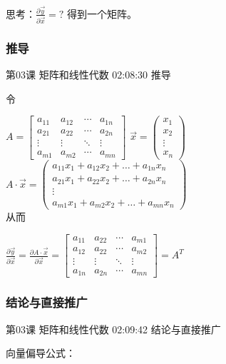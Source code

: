 \documentclass[UTF8]{ctexart}
\begin{document}
思考：$\frac{\partial \vec{y}}{\partial \vec{x}}=?$ 得到一个矩阵。

\subsubsection{推导}

第03课 矩阵和线性代数 02:08:30 推导

令

$A=
\begin{bmatrix} 
a_{11} & a_{12} & \cdots & a_{1n} \\
a_{21} & a_{22} & \cdots & a_{2n} \\
\vdots & \vdots & \ddots & \vdots \\
a_{m1} & a_{m2} & \cdots & a_{mn} 
\end{bmatrix}$ \quad
$\vec{x}=
\begin{pmatrix} 
x_{1} \\
x_{2} \\
\vdots \\
x_{n} 
\end{pmatrix}$\\

$A \cdot \vec{x}=
\begin{pmatrix}
a_{11}x_{1} + a_{12}x_{2}+\dots + a_{1n}x_{n} \\
a_{21}x_{1} + a_{22}x_{2}+\dots + a_{2n}x_{n} \\
\vdots \\
a_{m1}x_{1} + a_{m2}x_{2}+\dots + a_{mn}x_{n} 
\end{pmatrix}$\\

从而

$\frac{\partial \vec{y}}{\partial \vec{x}}=\frac{\partial A \cdot \vec{x}}{\partial \vec{x}}=
\begin{bmatrix}
a_{11} & a_{22} & \cdots & a_{m1} \\
a_{12} & a_{22} & \cdots & a_{m2} \\
\vdots & \vdots & \ddots & \vdots \\
a_{1n} & a_{2n} & \cdots & a_{mn}
\end{bmatrix}
=A^{T}$

\subsubsection{结论与直接推广}

第03课 矩阵和线性代数 02:09:42 结论与直接推广

向量偏导公式：
\end{document}
